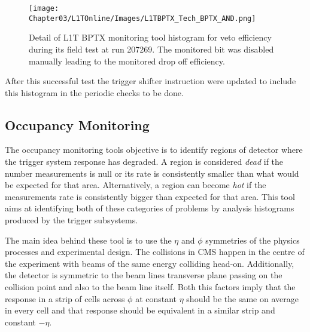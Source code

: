 \begin{figure}[!htb]
\centering
\texttt{[image: Chapter03/L1TOnline/Images/L1TBPTX\_Tech\_BPTX\_AND.png]}
\caption{Detail of \gls{L1T} \gls{BPTX} monitoring tool histogram for veto efficiency during its field test at run 207269. The monitored bit was disabled manually leading to the monitored drop off efficiency.} 
\label{FIGURE:TechnicalWork_L1TBPTX_ImplementationTests}
\end{figure}

After this successful test the trigger shifter instruction were updated to include this histogram in the periodic checks to be done.  

\subsection{Occupancy Monitoring}


The occupancy monitoring tools objective is to identify regions of detector where the trigger system response has degraded. A region is considered \textit{dead} if the number measurements is null or its rate is consistently smaller than what would be expected for that area. Alternatively, a region can become \textit{hot} if the measurements rate is consistently bigger than expected for that area. This tool aims at identifying both of these categories of problems by analysis histograms produced by the trigger subsystems.

The main idea behind these tool is to use the $\eta$ and $\phi$ symmetries of the physics processes and experimental design. The collisions in \gls{CMS} happen in the centre of the experiment with beams of the same energy colliding head-on. Additionally, the detector is symmetric to the beam lines transverse plane passing on the collision point and also to the beam line itself. Both this factors imply that the response in a strip of cells across $\phi$ at constant $\eta$ should be the same on average in every cell and that response should be equivalent in a similar strip and constant $-\eta$.

